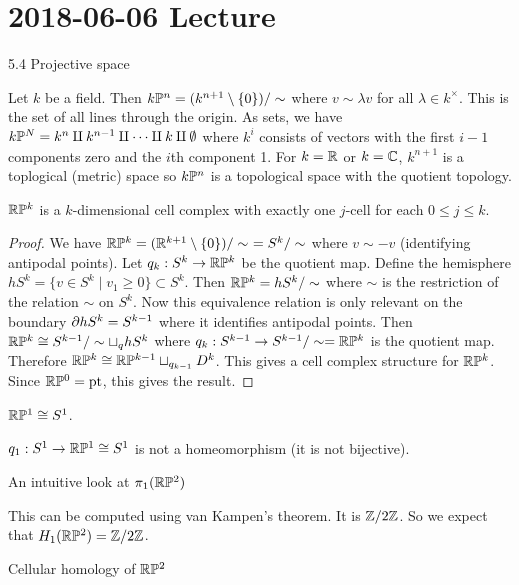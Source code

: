 \section{2018-06-06 Lecture}

5.4 Projective space

Let $k$ be a field.
Then $k\mathbb{P}^n = (k^{n+1} \setminus \{0\})/\sim$ where $v \sim \lambda v$ for all $\lambda \in k^\times$.
This is the set of all lines through the origin.
As sets, we have $k\mathbb{P}^N = k^n \amalg k^{n-1} \amalg \cdots \amalg k \amalg \emptyset$ where $k^i$ consists of vectors with the first $i-1$ components zero and the $i$th component 1.
For $k=\mathbb{R}$ or $k=\mathbb{C}$, $k^{n+1}$ is a toplogical (metric) space so $k\mathbb{P}^n$ is a topological space with the quotient topology.

\begin{lem}
  $\mathbb{R}\mathbb{P}^k$ is a $k$-dimensional cell complex with exactly one $j$-cell for each $0 \leq j \leq k$.
\end{lem}

\begin{proof}
  We have $\mathbb{R}\mathbb{P}^k = (\mathbb{R}^{k+1}\setminus\{0\})/\sim\ = S^k/\sim$ where $v \sim -v$ (identifying antipodal points).
  Let $q_k: S^k \to \mathbb{R}\mathbb{P}^k$ be the quotient map.
  Define the hemisphere $hS^k = \{ v \in S^k \mid v_1 \geq 0 \} \subset S^k$.
  Then $\mathbb{R}\mathbb{P}^k = hS^k/\sim$ where $\sim$ is the restriction of the relation $\sim$ on $S^k$.
  Now this equivalence relation is only relevant on the boundary $\partial hS^k = S^{k-1}$ where it identifies antipodal points.
  Then $\mathbb{R}\mathbb{P}^k \cong S^{k-1}/\sim \sqcup_q hS^k$ where $q_k: S^{k-1} \to S^{k-1}/\sim = \mathbb{R}\mathbb{P}^k$ is the quotient map.
  Therefore $\mathbb{R}\mathbb{P}^k \cong \mathbb{R}\mathbb{P}^{k-1} \sqcup_{q_{k-1}} D^k$.
  This gives a cell complex structure for $\mathbb{R}\mathbb{P}^k$.
  Since $\mathbb{R}\mathbb{P}^0=\operatorname{pt}$, this gives the result.
\end{proof}

\begin{exam}
  $\mathbb{R}\mathbb{P}^1 \cong S^1$.
\end{exam}

\begin{rmk}
  $q_1: S^1 \to \mathbb{R}\mathbb{P}^1 \cong S^1$ is not a homeomorphism (it is not bijective).
\end{rmk}

An intuitive look at $\pi_1(\mathbb{R}\mathbb{P}^2)$

This can be computed using van Kampen's theorem.
It is $\mathbb{Z}/2\mathbb{Z}$.
So we expect that $H_1(\mathbb{R}\mathbb{P}^2)=\mathbb{Z}/2\mathbb{Z}$.

Cellular homology of $\mathbb{R}\mathbb{P}^2$

